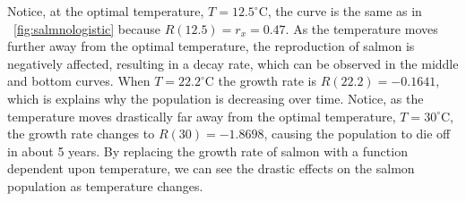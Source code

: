 Notice, at the optimal temperature, $T=12.5^{\circ}$C, the curve is the same as in \figureautorefname~\ref{fig:salmnologistic} because $R(12.5) = r_x = 0.47$. 
As the temperature moves further away from the optimal temperature, the reproduction of salmon is negatively affected, resulting in a decay rate, which can be observed in the middle and bottom curves.
When $T=22.2^{\circ}$C the growth rate is $R(22.2) = -0.1641$, which is explains why the population is decreasing over time.
Notice, as the temperature moves drastically far away from the optimal temperature, $T=30^{\circ}$C, the growth rate changes to $R(30)=-1.8698$, causing the population to die off in about 5 years.
By replacing the growth rate of salmon with a function dependent upon temperature, we can see the drastic effects on the salmon population as temperature changes.
